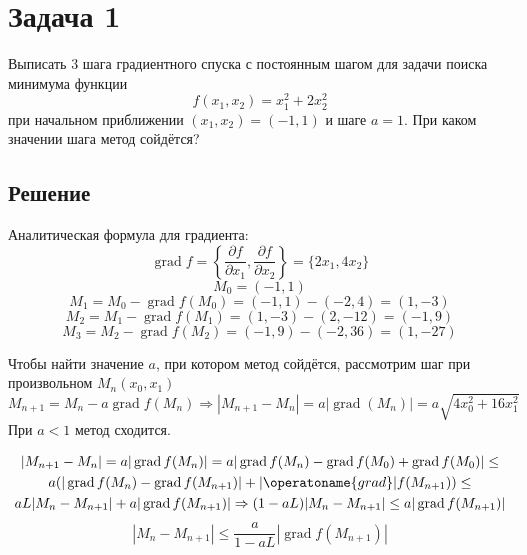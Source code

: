 \documentclass[11pt]{article}
\author{Sergey Makarov}
\date{\today}
\title{}
\begin{document}
\section{Задача 1}
\label{sec:orgdf0d08d}
Выписать 3 шага градиентного спуска с постоянным шагом для задачи поиска минимума функции
\begin{equation}
f(x_1, x_2) = x_1^2 + 2x_2^2
\end{equation}
при начальном приближении $(x_1, x_2) = (-1, 1)$ и шаге $a = 1$. При каком значении шага метод сойдётся?
\subsection{Решение}
\label{sec:orgeaa121a}
Аналитическая формула для градиента:
\begin{equation}
\operatorname{grad} f = \left\{\frac{\partial f}{\partial x_1}, \frac{\partial f}{\partial x_2}\right\} = \{2x_1, 4x_2\}
\end{equation}
\begin{equation}
M_0 = (-1, 1)
\end{equation}
\begin{equation}
M_1 = M_0 - \operatorname{grad}f(M_0) = (-1, 1) - (-2, 4) = (1, -3)
\end{equation}
\begin{equation}
M_2 = M_1 - \operatorname{grad}f(M_1) = (1, -3) - (2, -12) = (-1, 9)
\end{equation}
\begin{equation}
M_3 = M_2 - \operatorname{grad}f(M_2) = (-1, 9) - (-2, 36) = (1, -27)
\end{equation}

Чтобы найти значение \(a\), при котором метод сойдётся, рассмотрим шаг при произвольном \(M_n(x_0, x_1)\)
\begin{equation}
M_{n + 1} = M_n - a\operatorname{grad}f(M_n) \Rightarrow |M_{n + 1} - M_n| = a|\operatorname{grad}(M_n)| = a\sqrt{4x_0^2 + 16x_1^2}
\end{equation}
При \(a < 1\) метод сходится.

\begin{multline}
|M_{n + 1} - M_n| = a|\operatorname{grad}f(M_n)| = a|\operatorname{grad}f(M_n) - \operatorname{grad}f(M_0) + \operatorname{grad}f(M_0)| \leq \\
a(|\operatorname{grad}f(M_n) - \operatorname{grad}f(M_{n + 1})| + |\operatoname{grad}|f(M_{n + 1})) \leq \\
aL|M_n - M_{n + 1}| + a|\operatorname{grad}f(M_{n + 1})| \Rightarrow (1 - aL)|M_{n} - M_{n + 1}| \leq a|\operatorname{grad}f(M_{n + 1})|
\end{multline}
\begin{equation}
|M_{n} - M_{n + 1}| \leq \frac{a}{1 - aL}|\operatorname{grad}f(M_{n + 1})|
\end{equation}
\end{document}
